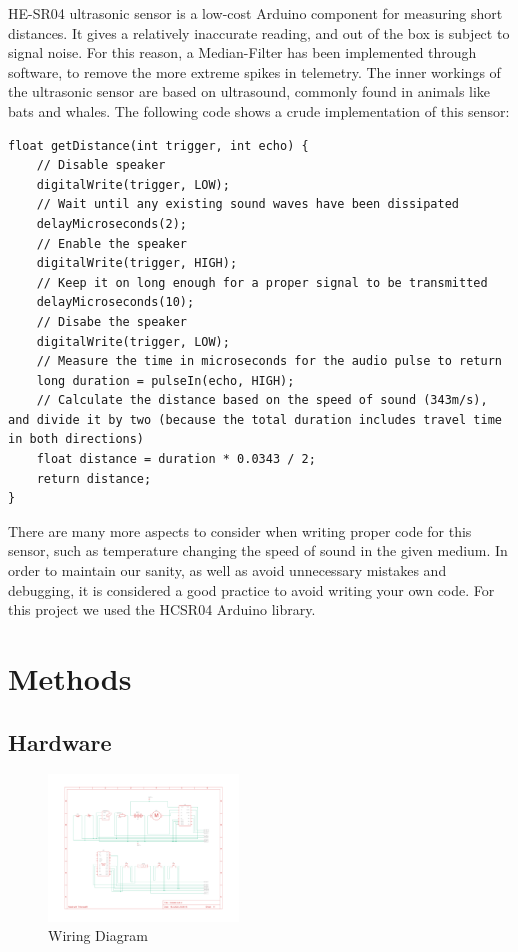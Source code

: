 \documentclass[journal]{IEEEtran}
\begin{document}
 HE-SR04 ultrasonic sensor is a low-cost Arduino component for measuring short distances. It gives a relatively inaccurate reading, and out of the box is subject to signal noise. For this reason, a Median-Filter has been implemented through software, to remove the more extreme spikes in telemetry. The inner workings of the ultrasonic sensor are based on ultrasound, commonly found in animals like bats and whales. The following code shows a crude implementation of this sensor:
\begin{lstlisting}
float getDistance(int trigger, int echo) {
    // Disable speaker
    digitalWrite(trigger, LOW);
    // Wait until any existing sound waves have been dissipated
    delayMicroseconds(2);
    // Enable the speaker
    digitalWrite(trigger, HIGH);
    // Keep it on long enough for a proper signal to be transmitted
    delayMicroseconds(10);
    // Disabe the speaker
    digitalWrite(trigger, LOW);
    // Measure the time in microseconds for the audio pulse to return
    long duration = pulseIn(echo, HIGH);
    // Calculate the distance based on the speed of sound (343m/s), and divide it by two (because the total duration includes travel time in both directions)
    float distance = duration * 0.0343 / 2;
    return distance;
}
\end{lstlisting}
There are many more aspects to consider when writing proper code for this sensor, such as temperature changing the speed of sound in the given medium. In order to maintain our sanity, as well as avoid unnecessary mistakes and debugging, it is considered a good practice to avoid writing your own code. For this project we used the HCSR04 Arduino library.

\section{Methods}
\subsection{Hardware}


\begin{figure}[H]%
    \begin {center}
    \includegraphics[width=0.45\textwidth, trim={0 2cm 0 2cm}]{images/wiring-diagram.pdf}
    \caption{Wiring Diagram}
    \label{fig:wiring}
    \end {center}
\end{figure}
\end{document}
